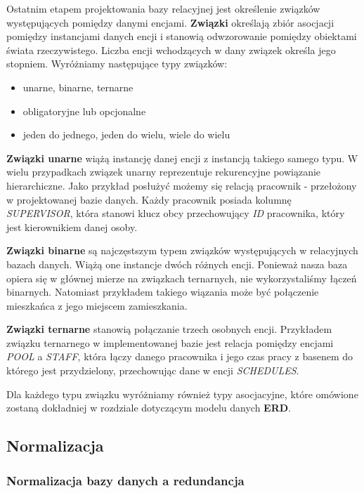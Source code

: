 \documentclass[a4paper]{article}
\begin{document}
Ostatnim etapem projektowania bazy relacyjnej jest określenie związków występujących pomiędzy danymi encjami. \textbf{Związki} określają zbiór asocjacji pomiędzy instancjami danych encji i stanowią odwzorowanie pomiędzy obiektami świata rzeczywistego. Liczba encji wchodzących w dany związek określa jego stopniem. Wyróżniamy następujące typy związków:
\begin{itemize}
    \item unarne, binarne, ternarne
    \item obligatoryjne lub opcjonalne
    \item jeden do jednego, jeden do wielu, wiele do wielu
\end{itemize}

\textbf{Związki unarne} wiążą instancję danej encji z instancją takiego samego typu. W wielu przypadkach związek unarny reprezentuje rekurencyjne powiązanie hierarchiczne. Jako przykład posłużyć możemy się relacją pracownik - przełożony w projektowanej bazie danych. Każdy pracownik posiada kolumnę \textit{SUPERVISOR}, która stanowi klucz obcy przechowujący \textit{ID} pracownika, który jest kierownikiem danej osoby.

\textbf{Związki binarne} są najczęstszym typem związków występujących w relacyjnych bazach danych. Wiążą one instancje dwóch różnych encji. Ponieważ nasza baza opiera się w głównej mierze na związkach ternarnych, nie wykorzystaliśmy łączeń binarnych. Natomiast przykładem takiego wiązania może być połączenie mieszkańca z jego miejscem zamieszkania.

\textbf{Związki ternarne} stanowią połączanie trzech osobnych encji. Przykładem związku ternarnego w implementowanej bazie jest relacja pomiędzy encjami \textit{POOL} a  \textit{STAFF}, która łączy danego pracownika i jego czas pracy z basenem do którego jest przydzielony, przechowując dane w encji \textit{SCHEDULES}.

Dla każdego typu związku wyróżniamy również typy asocjacyjne, które omówione zostaną dokładniej w rozdziale dotyczącym modelu danych \textbf{ERD}.

\subsection{Normalizacja} \label{Redundancja}

\subsubsection{Normalizacja bazy danych a redundancja}
\end{document}
